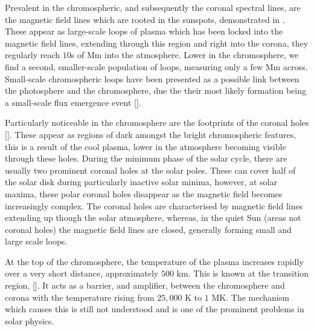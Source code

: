 Prevalent in the chromospheric, and subsequently the coronal spectral lines, are the magnetic field lines which are rooted in the sunspots, demonstrated in \cite{Athay1976}.
These appear as large-scale loops of plasma which has been locked into the magnetic field lines, extending through this region and right into the corona, they regularly reach $10$s of Mm into the atmosphere.
Lower in the chromosphere, we find a second, smaller-scale population of loops, measuring only a few Mm across.
Small-scale chromospheric loops have been presented as a possible link between the photosphere and the chromosphere, due the their most likely formation being a small-scale flux emergence event [\cite{Ulmschneider1982}].

Particularly noticeable in the chromosphere are the footprints of the coronal holes [\cite{Cranmer2009}].
These appear as regions of dark amongst the bright chromospheric features, this is a result of the cool plasma, lower in the atmosphere becoming visible through these holes.
During the minimum phase of the solar cycle, there are usually two prominent coronal holes at the solar poles. 
These can cover half of the solar disk during particularly inactive solar minima, however, at solar maxima, these polar coronal holes disappear as the magnetic field becomes increasingly complex.
The coronal holes are characterised by magnetic field lines extending up though the solar atmosphere, whereas, in the quiet Sun (areas not coronal holes) the magnetic field lines are closed, generally forming small and large scale loops.

At the top of the chromosphere, the temperature of the plasma increases rapidly over a very short distance, approximately $500$ km. 
This is known at the transition region, [\cite{Mariska1986}].
It acts as a barrier, and amplifier, between the chromosphere and corona with the temperature rising from $25,000$ K to $1$ MK. The mechanism which causes this is still not understood and is one of the prominent problems in solar physics.

